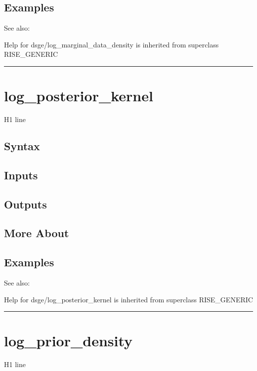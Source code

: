 \documentclass[letterpaper,10pt,english]{sphinxmanual}
\begin{document}
\subsection{Examples}
\label{classes/models/@dsge/dsge:id97}
See also:

Help for dsge/log\_marginal\_data\_density is inherited from superclass RISE\_GENERIC


\bigskip\hrule{}\bigskip



\section{log\_posterior\_kernel}
\label{classes/models/@dsge/dsge:log-posterior-kernel}\label{classes/models/@dsge/dsge:id98}
H1 line


\subsection{Syntax}
\label{classes/models/@dsge/dsge:id99}

\subsection{Inputs}
\label{classes/models/@dsge/dsge:id100}

\subsection{Outputs}
\label{classes/models/@dsge/dsge:id101}

\subsection{More About}
\label{classes/models/@dsge/dsge:id102}

\subsection{Examples}
\label{classes/models/@dsge/dsge:id103}
See also:

Help for dsge/log\_posterior\_kernel is inherited from superclass RISE\_GENERIC


\bigskip\hrule{}\bigskip



\section{log\_prior\_density}
\label{classes/models/@dsge/dsge:id104}\label{classes/models/@dsge/dsge:log-prior-density}
H1 line
\end{document}
